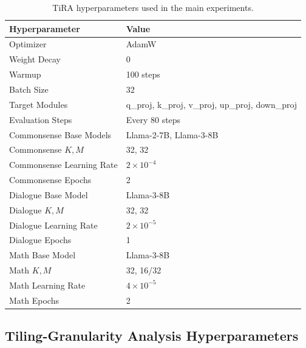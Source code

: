 \documentclass[a4paper,11pt]{article}
\begin{document}
\begin{table}[H]
\centering
\caption{TiRA hyperparameters used in the main experiments.}
\begin{tabular}{ll}
\toprule
Hyperparameter & Value \\
\midrule
Optimizer & AdamW \\
Weight Decay & 0 \\
Warmup & 100 steps \\
Batch Size & 32 \\
Target Modules & q\_proj, k\_proj, v\_proj, up\_proj, down\_proj \\
Evaluation Steps & Every 80 steps \\
\midrule
Commonsense Base Models & Llama-2-7B, Llama-3-8B \\
Commonsense $K,M$ & 32, 32 \\
Commonsense Learning Rate & $2\times10^{-4}$ \\
Commonsense Epochs & 2 \\
\midrule
Dialogue Base Model & Llama-3-8B \\
Dialogue $K,M$ & 32, 32 \\
Dialogue Learning Rate & $2\times10^{-5}$ \\
Dialogue Epochs & 1 \\
\midrule
Math Base Model & Llama-3-8B \\
Math $K,M$ & 32, 16/32 \\
Math Learning Rate & $4\times10^{-5}$ \\
Math Epochs & 2 \\
\bottomrule
\end{tabular}
\end{table}

\subsection{Tiling-Granularity Analysis Hyperparameters}
\label{app:ablation_hyperparams}
\end{document}
